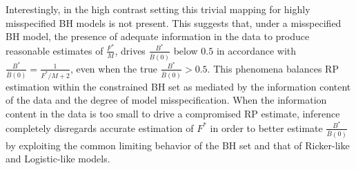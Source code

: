 %
Interestingly, in the high contrast setting this trivial mapping for highly 
misspecified BH models is not present. This suggests that, under a 
misspecified BH model, the presence of adequate information in the data to 
produce reasonable estimates of $\frac{F^*}{M}$, drives $\frac{B^*}{\bar B(0)}$ 
below $0.5$ in accordance with $\frac{B^*}{\bar B(0)}=\frac{1}{F^*/M+2}$, 
even when the true $\frac{B^*}{\bar B(0)}>0.5$. 
This phenomena balances RP estimation within the constrained BH set as 
mediated by the information content of the data and the degree of model 
misspecification. When the information content in the data is too small to 
drive a compromised RP estimate, inference completely disregards accurate 
estimation of $F^*$ in order to better estimate $\frac{B^*}{\bar B(0)}$ 
by exploiting the common limiting behavior of the BH set and that of 
Ricker-like and Logistic-like models. 


%
%
%
%
%




